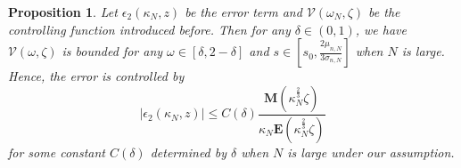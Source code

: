 \documentclass[11pt]{article}
\newtheorem{proposition}[theorem]{Proposition}
\numberwithin{equation}{section}%
\numberwithin{theorem}{section}
\begin{document}
\begin{proposition}\label{ex2}
    Let $\epsilon_2(\kappa_N,z)$ be the error term and $\mathcal{V}(\omega_N,\zeta)$ be the controlling function introduced before. Then for any $\delta\in(0,1)$, we have $\mathcal{V}(\omega,\zeta)$ is bounded for any $\omega\in[\delta,2-\delta]$ and $s\in\left[s_0,\frac{2\mu_{n,N}}{3\sigma_{n,N}}\right]$ when $N$ is large. Hence, the error is controlled by
    \begin{equation}\label{B4epsilon}
        |\epsilon_2(\kappa_N,z)|\le C(\delta)\frac{\mathbf{M}\left(\kappa_N^\frac{2}{3}\zeta\right)}{\kappa_N\mathbf{E}\left(\kappa_N^\frac{2}{3}\zeta\right)}
    \end{equation}
    for some constant $C(\delta)$ determined by $\delta$ when $N$ is large under our assumption.
\end{proposition}
\end{document}
